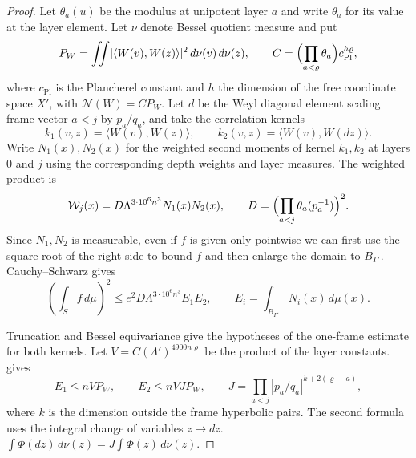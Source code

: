 \begin{proof}
Let $\theta_a(u)$ be the modulus at unipotent layer $a$ and write $\theta_a$ for its value at the layer element.
Let $\nu$ denote Bessel quotient measure and put
\[
 P_W=\iint \lvert\langle W(v),W(z)\rangle\rvert^2\,d\nu(v)\,d\nu(z),
 \qquad
 C=\Bigl(\prod_{a<\varrho}\theta_a\Bigr)c_{\mathrm{Pl}}^{h\varrho},
\]
where $c_{\mathrm{Pl}}$ is the Plancherel constant and $h$ the dimension of the free coordinate space $X'$,
with $\mathcal N(W)=CP_W$. Let $d$ be the Weyl diagonal element scaling frame vector $a<j$ by
$p_a/q_a$, and take the correlation kernels
\[
 k_1(v,z)=\langle W(v),W(z)\rangle,\qquad
 k_2(v,z)=\langle W(v),W(dz)\rangle .
\]
Write $N_1(x),N_2(x)$ for the weighted second moments of kernel $k_1,k_2$ at layers $0$ and $j$
using the corresponding depth weights and layer measures.
The weighted product is
\[
 \mathcal W_j(x)=D\Lambda^{3\cdot10^6 n^3}N_1(x)N_2(x),
 \qquad
 D=\Bigl(\prod_{a<j}\theta_a(p_a^{-1})\Bigr)^2 .
\]
Since $N_1,N_2$ is measurable, even if $f$ is given only pointwise we can first use the square root of the right side
to bound $f$ and then enlarge the domain to $B_{\Gamma'}$. Cauchy--Schwarz gives
\[
 \left(\int_S f\,d\mu\right)^2
 \le e^2D\Lambda^{3\cdot10^6n^3}E_1E_2,\qquad
 E_i=\int_{B_{\Gamma'}}N_i(x)\,d\mu(x).
\]

Truncation and Bessel equivariance give the hypotheses of the one-frame estimate for both kernels.
Let $V=C(\Lambda')^{4900n\varrho}$ be the product of the layer constants.
 gives
\[
 E_1\le nVP_W,\qquad E_2\le nV JP_W,\qquad
 J=\prod_{a<j}|p_a/q_a|^{k+2(\varrho-a)},
\]
where $k$ is the dimension outside the frame hyperbolic pairs. The second formula uses the integral change of variables $z\mapsto dz$.
$\int \Phi(dz)\,d\nu(z)=J\int\Phi(z)\,d\nu(z)$.


\end{proof}
